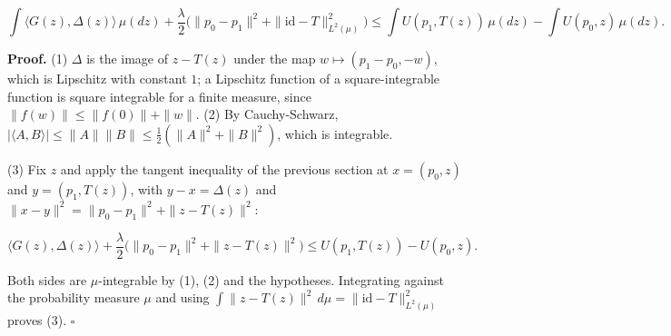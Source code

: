 \documentclass[11pt,a4paper]{report}
\begin{document}
\[\int\langle G(z),\Delta(z)\rangle\,\mu(dz)+\frac\lambda2\bigl(\|p_0-p_1\|^2+\|\mathrm{id}-T\|_{L^2(\mu)}^2\bigr)\le\int U(p_1,T(z))\,\mu(dz)-\int U(p_0,z)\,\mu(dz).\]


\textbf{Proof.} (1) \(\Delta\) is the image of \(z-T(z)\) under the map \(w\mapsto(p_1-p_0,-w)\), which is Lipschitz with constant \(1\); a Lipschitz function of a square-integrable function is square integrable for a finite measure, since \(\|f(w)\|\le\|f(0)\|+\|w\|\). (2) By Cauchy-Schwarz, \(|\langle A,B\rangle|\le\|A\|\|B\|\le\frac12(\|A\|^2+\|B\|^2)\), which is integrable.




(3) Fix \(z\) and apply the tangent inequality of the previous section at \(x=(p_0,z)\) and \(y=(p_1,T(z))\), with \(y-x=\Delta(z)\) and \(\|x-y\|^2=\|p_0-p_1\|^2+\|z-T(z)\|^2\):


\[\langle G(z),\Delta(z)\rangle+\frac\lambda2\bigl(\|p_0-p_1\|^2+\|z-T(z)\|^2\bigr)\le U(p_1,T(z))-U(p_0,z).\]


Both sides are \(\mu\)-integrable by (1), (2) and the hypotheses. Integrating against the probability measure \(\mu\) and using \(\int\|z-T(z)\|^2\,d\mu=\|\mathrm{id}-T\|^2_{L^2(\mu)}\) proves (3). \(\square\)
\end{document}
